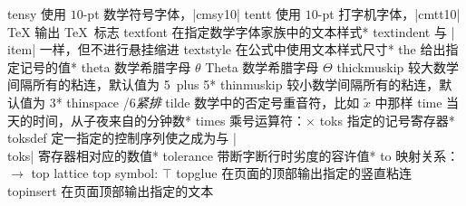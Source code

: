 \capcs tensy {使用 $10$-pt 数学符号字体，|cmsy10|}{}{}
\capcs tentt {使用 $10$-pt 打字机字体，|cmtt10|}{}{}
\capcs TeX {输出 \TeX\ 标志}{}{}
\capcs textfont {在指定数学字体家族中的文本样式}*{}
\capcs textindent {与 |\\item| 一样，但不进行悬挂缩进}{}{}
\capcs textstyle {在公式中使用文本样式尺寸}*{}
\capcs the {给出指定记号的值}*{}
\capcs theta {数学希腊字母 $\theta$}{}{}
\capcs Theta {数学希腊字母 $\Theta$}{}{}
\capcs thickmuskip {较大数学间隔所有的粘连，默认值为 5\mud\ plus 5\mud}*{}
\capcs thinmuskip {较小数学间隔所有的粘连，默认值为 3\mud}*{}
\capcs thinspace {/6\em 紧排}{}{}
\capcs tilde {数学中的否定号重音符，比如 $\tilde x$ 中那样}{}{}
\capcs time {当天的时间，从子夜来自的分钟数}*{}
\capcs times {乘号运算符：$\times$}{}{}
\capcs toks {指定的记号寄存器}*{}
\capcs toksdef {定一指定的控制序列使之成为与 |\\toks| 寄存器相对应的数值}*{}
\capcs tolerance {带断字断行时劣度的容许值}*{}
\capcs to {映射关系：$\to$}{}{}
\capcs top {lattice top symbol: $\top$}{}{}
\capcs topglue {在页面的顶部输出指定的竖直粘连}{}{}
\capcs topinsert {在页面顶部输出指定的文本}{}{}
